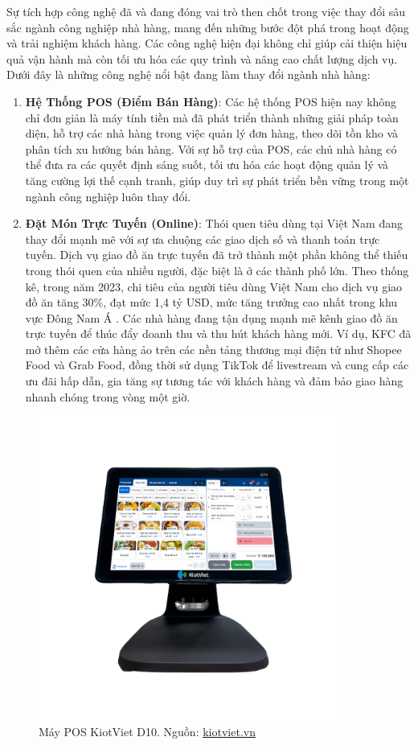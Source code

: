 Sự tích hợp công nghệ đã và đang đóng vai trò then chốt trong việc thay đổi sâu sắc ngành công nghiệp nhà hàng, mang đến những bước đột phá trong hoạt động và trải nghiệm khách hàng. Các công nghệ hiện đại không chỉ giúp cải thiện hiệu quả vận hành mà còn tối ưu hóa các quy trình và nâng cao chất lượng dịch vụ. Dưới đây là những công nghệ nổi bật đang làm thay đổi ngành nhà hàng:
\begin{enumerate}
    \item \textbf{Hệ Thống POS (Điểm Bán Hàng)}: Các hệ thống POS hiện nay không chỉ đơn giản là máy tính tiền mà đã phát triển thành những giải pháp toàn diện, hỗ trợ các nhà hàng trong việc quản lý đơn hàng, theo dõi tồn kho và phân tích xu hướng bán hàng. Với sự hỗ trợ của POS, các chủ nhà hàng có thể đưa ra các quyết định sáng suốt, tối ưu hóa các hoạt động quản lý và tăng cường lợi thế cạnh tranh, giúp duy trì sự phát triển bền vững trong một ngành công nghiệp luôn thay đổi.
    \item \textbf{Đặt Món Trực Tuyến (Online)}: Thói quen tiêu dùng tại Việt Nam đang thay đổi mạnh mẽ với sự ưa chuộng các giao dịch số và thanh toán trực tuyến. Dịch vụ giao đồ ăn trực tuyến đã trở thành một phần không thể thiếu trong thói quen của nhiều người, đặc biệt là ở các thành phố lớn. Theo thống kê, trong năm 2023, chi tiêu của người tiêu dùng Việt Nam cho dịch vụ giao đồ ăn tăng 30\%, đạt mức 1,4 tỷ USD, mức tăng trưởng cao nhất trong khu vực Đông Nam Á \cite{USDA}. Các nhà hàng đang tận dụng mạnh mẽ kênh giao đồ ăn trực tuyến để thúc đẩy doanh thu và thu hút khách hàng mới. Ví dụ, KFC đã mở thêm các cửa hàng ảo trên các nền tảng thương mại điện tử như Shopee Food và Grab Food, đồng thời sử dụng TikTok để livestream và cung cấp các ưu đãi hấp dẫn, gia tăng sự tương tác với khách hàng và đảm bảo giao hàng nhanh chóng trong vòng một giờ.
\end{enumerate}

\begin{figure}[H]
    \centering
    \includegraphics[width=10cm]{Images/kiosViet.png}
    \caption{Máy POS KiotViet D10. Nguồn: \href{https://www.kiotviet.vn/top-4-may-tinh-tien-cho-quan-an-quan-cafe-tot-nhat-hien-nay/}{kiotviet.vn}}
\end{figure}

